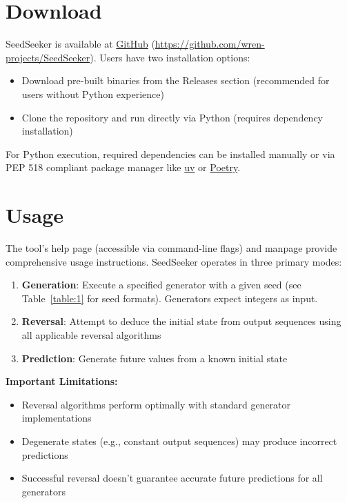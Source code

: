 \documentclass[12pt, a4paper]{report}
\begin{document}
\section{Download}
SeedSeeker is available at \href{https://github.com/wren-projects/SeedSeeker}{GitHub} 
(\url{https://github.com/wren-projects/SeedSeeker}). Users have two installation options:

\begin{itemize}
    \item Download pre-built binaries from the Releases section (recommended for users without Python experience)
    \item Clone the repository and run directly via Python (requires dependency installation)
\end{itemize}

For Python execution, required dependencies can be installed manually or via PEP 518 compliant package manager like 
\href{https://github.com/astral-sh/uv}{uv} or \href{https://python-poetry.org}{Poetry}.

\section{Usage}
The tool's help page (accessible via command-line flags) and manpage provide comprehensive usage instructions. 
SeedSeeker operates in three primary modes:

\begin{enumerate}
    \item \textbf{Generation}: Execute a specified generator with a given seed 
        (see Table~\ref{table:1} for seed formats). Generators expect integers as input.
    \item \textbf{Reversal}: Attempt to deduce the initial state 
        from output sequences using all applicable reversal algorithms
    \item \textbf{Prediction}: Generate future values from a known initial state
\end{enumerate}

\textbf{Important Limitations:}
\begin{itemize}
    \item Reversal algorithms perform optimally with standard generator implementations
    \item Degenerate states (e.g., constant output sequences) may produce incorrect predictions
    \item Successful reversal doesn't guarantee accurate future predictions for all generators
\end{itemize}
\end{document}
